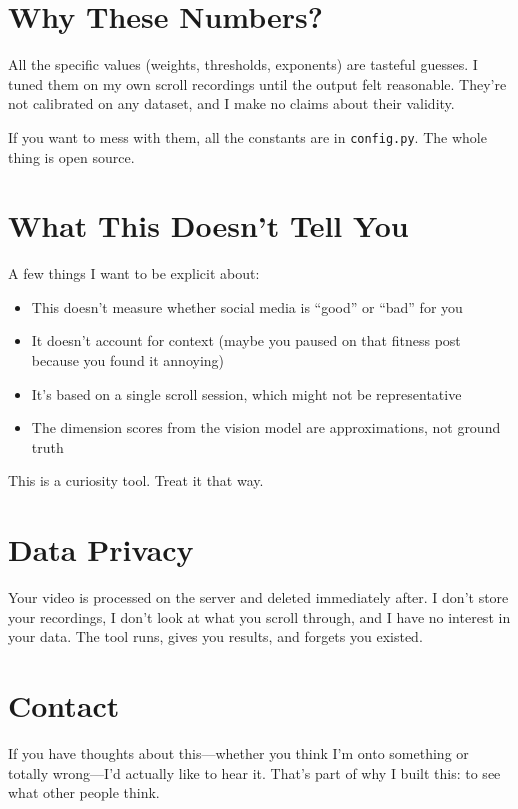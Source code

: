 \documentclass[11pt]{article}
\begin{document}
\section{Why These Numbers?}

All the specific values (weights, thresholds, exponents) are tasteful guesses. I tuned them on my own scroll recordings until the output felt reasonable. They're not calibrated on any dataset, and I make no claims about their validity.

If you want to mess with them, all the constants are in \texttt{config.py}. The whole thing is open source.

\section{What This Doesn't Tell You}

A few things I want to be explicit about:
\begin{itemize}
    \item This doesn't measure whether social media is ``good'' or ``bad'' for you
    \item It doesn't account for context (maybe you paused on that fitness post because you found it annoying)
    \item It's based on a single scroll session, which might not be representative
    \item The dimension scores from the vision model are approximations, not ground truth
\end{itemize}

This is a curiosity tool. Treat it that way.

\section*{Data Privacy}

Your video is processed on the server and deleted immediately after. I don't store your recordings, I don't look at what you scroll through, and I have no interest in your data. The tool runs, gives you results, and forgets you existed.

\section*{Contact}

If you have thoughts about this—whether you think I'm onto something or totally wrong—I'd actually like to hear it. That's part of why I built this: to see what other people think.
\end{document}
